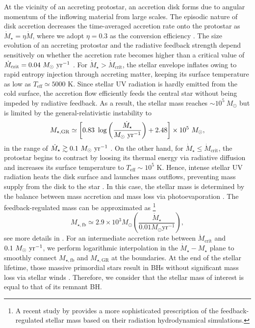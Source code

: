 \documentclass[twocolumn, twocolappendix]{aastex63}
\newcommand{\Msun}{M_\odot}
\newcommand{\Msunyr}{M_\odot~{\rm yr}^{-1}}
\newcommand{\Mdot}{\dot{M}}
\newcommand{\blue}[1]{\textcolor{blue}{ #1}}
\begin{document}
\begin{CJK*}{UTF8}{gbsn}
At the vicinity of an accreting protostar, an accretion disk forms due to angular momentum of the inflowing material from large scales. 
The episodic nature of disk accretion decreases the time-averaged accretion rate onto the protostar as $\Mdot_{\star}=\eta \Mdot$, 
where we adopt $\eta=0.3$ as the conversion efficiency \citep{2016MNRAS.459.1137S, 2022arXiv220614459T}. 
The size evolution of an accreting protostar and the radiative feedback strength depend sensitively on whether
the accretion rate becomes higher than a critical value of $\dot{M}_{\mathrm{crit}}=0.04~\Msunyr$ 
\citep{2001ApJ...561L..55O,2013ApJ...778..178H,2013A&A...558A..59S,2015MNRAS.452..755S,2018MNRAS.474.2757H}.
For $\dot{M}_\star > \Mdot_\mathrm{crit}$, the stellar envelope inflates owing to rapid entropy injection through accreting matter,
keeping its surface temperature as low as $T_\mathrm{eff} \simeq 5000$ K. 
Since stellar UV radiation is hardly emitted from the cold surface, the accretion flow efficiently feeds the central star without being 
impeded by radiative feedback.
As a result, the stellar mass reaches $\sim 10^5~\Msun$ but is limited by the general-relativistic instability to
%
\begin{equation}
 M_{\star, \mathrm{GR}} \simeq\left[0.83~\log \left(\frac{\dot{M}_{\star}}{\Msunyr}\right)+2.48\right] \times 10^{5} ~\Msun,
\end{equation}
%
in the range of $\dot{M}_\star\gtrsim 0.1~\Msunyr$ \citep{2016PhRvD..94b1501S,2017ApJ...842L...6W,2019PASA...36...27W}.
On the other hand, for $\dot{M}_\star \leq \Mdot_\mathrm{crit}$, the protostar begins to contract by loosing its thermal energy via radiative diffusion
and increases its surface temperature to $T_\mathrm{eff} \sim 10^5$ K.
Hence, intense stellar UV radiation heats the disk surface and launches mass outflows, preventing mass supply from the disk to the star
\citep{2008ApJ...681..771M,2011Sci...334.1250H}. 
In this case, the stellar mass is determined by the balance between mass accretion and mass loss via photoevaporation \citep{2013ApJ...773..155T}.
The feedback-regulated mass can be approximated as
\footnote[2]{A recent study by \citet{2022arXiv220614459T} provides a more sophisticated prescription of the feedback-regulated stellar mass based on their radiation hydrodynamical simulations.}
%
\begin{equation}
M_{\star, \mathrm{fb}} \simeq 2.9 \times 10^{3} \Msun\left(\frac{\dot{M}_{\star}}{0.01 M_{\odot} \mathrm{yr}^{-1}}\right),
\end{equation}
%
see more details in \cite{2021ApJ...917...60L}.
For an intermediate accretion rate between $\Mdot_\mathrm{crit}$ and $0.1~\Msunyr$, 
we perform logarithmic interpolation in the $\Mdot_\star - M_\star$ plane to smoothly connect 
$M_{\star, \mathrm{fb}}$ and $M_{\star, \mathrm{GR}}$ at the boundaries.
At the end of the stellar lifetime, those massive primordial stars result in BHs without significant mass loss 
via stellar winds \citep{2003ApJ...591..288H,2010ApJ...714.1217B,2015MNRAS.451.4086S}.
Therefore, we consider that the stellar mass of interest is equal to that of its remnant BH.



\end{CJK*}
\end{document}
